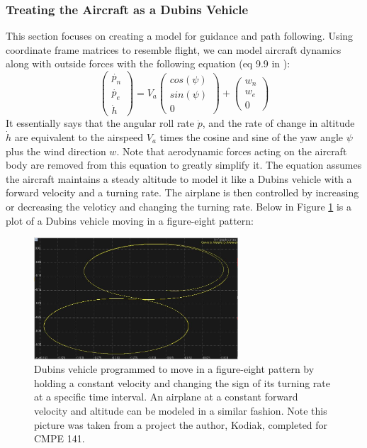 \documentclass[12pt,journal,compsoc]{IEEEtran}
\begin{document}
\subsubsection{Treating the Aircraft as a Dubins Vehicle}
This section focuses on creating a model for guidance and path following. Using coordinate frame matrices to resemble flight, we can model aircraft dynamics along with outside forces with the following equation (eq 9.9 in \cite{S-U-A}):
\[ \begin{pmatrix}
\dot{p_n} \\
\dot{p_e} \\
\dot{h}
\end{pmatrix}  
= V_a \begin{pmatrix}
cos(\psi) \\
sin(\psi) \\
0
\end{pmatrix}
+ \begin{pmatrix}
w_n \\
w_e \\
0
\end{pmatrix}
\]
It essentially says that the angular roll rate $\dot{p}$, and the rate of change in altitude $\dot{h}$ are equivalent to the airspeed $V_a$ times the cosine and sine of the yaw angle $\psi$ plus the wind direction $w$. Note that aerodynamic forces acting on the aircraft body are removed from this equation to greatly simplify it. The equation assumes the aircraft maintains a steady altitude to model it like a Dubins vehicle with a forward velocity and a turning rate. The airplane is then controlled by increasing or decreasing the veloticy and changing the turning rate. Below in Figure \ref{f8} is a plot of a Dubins vehicle moving in a figure-eight pattern:
\begin{figure}[h!]
\hspace*{0cm}
\centering
\includegraphics[width=3in]{dubins_fig8.jpg}
\caption{Dubins vehicle programmed to move in a figure-eight pattern by holding a constant velocity and changing the sign of its turning rate at a specific time interval. An airplane at a constant forward velocity and altitude can be modeled in a similar fashion. Note this picture was taken from a project the author, Kodiak, completed for CMPE 141.}
\label{f8}
\end{figure}
\end{document}
